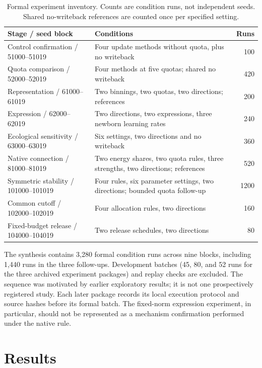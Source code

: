 \documentclass[11pt]{article}
\begin{document}
\begin{table}[htbp]\centering\small
\caption{Formal experiment inventory. Counts are condition runs, not independent seeds. Shared no-writeback references are counted once per specified setting.}
\begin{tabular}{p{3.7cm}p{6.2cm}r}\toprule
Stage / seed block & Conditions & Runs\\\midrule
Control confirmation / 51000--51019 & Four update methods without quota, plus no writeback &100\\
Quota comparison / 52000--52019 & Four methods at five quotas; shared no writeback &420\\
Representation / 61000--61019 & Two binnings, two quotas, two directions; references &200\\
Expression / 62000--62019 & Two directions, two expressions, three newborn learning rates &240\\
Ecological sensitivity / 63000--63019 & Six settings, two directions and no writeback &360\\
Native connection / 81000--81019 & Two energy shares, two quota rules, three strengths, two directions; references &520\\
Symmetric stability / 101000--101019 & Four rules, six parameter settings, two directions; bounded quota follow-up &1200\\
Common cutoff / 102000--102019 & Four allocation rules, two directions &160\\
Fixed-budget release / 104000--104019 & Two release schedules, two directions &80\\\bottomrule
\end{tabular}\label{tab:inventory}
\end{table}

The synthesis contains 3,280 formal condition runs across nine blocks, including 1,440 runs in the three follow-ups. Development batches (45, 80, and 52 runs for the three archived experiment packages) and replay checks are excluded. The sequence was motivated by earlier exploratory results; it is not one prospectively registered study. Each later package records its local execution protocol and source hashes before its formal batch. The fixed-norm expression experiment, in particular, should not be represented as a mechanism confirmation performed under the native rule.

\section{Results}
\end{document}
